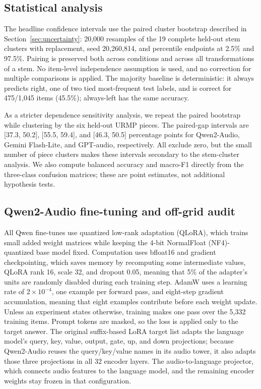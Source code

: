 \documentclass{article}
\begin{document}
\subsection{Statistical analysis}
\label{sec:appendix-stats}

The headline confidence intervals use the paired cluster bootstrap described in Section~\ref{sec:uncertainty}: 20,000 resamples of the 19 complete held-out stem clusters with replacement, seed 20,260,814, and percentile endpoints at 2.5\% and 97.5\%. Pairing is preserved both across conditions and across all transformations of a stem. No item-level independence assumption is used, and no correction for multiple comparisons is applied. The majority baseline is deterministic: it always predicts right, one of two tied most-frequent test labels, and is correct for 475/1,045 items (45.5\%); always-left has the same accuracy.

As a stricter dependence sensitivity analysis, we repeat the paired bootstrap while clustering by the six held-out URMP pieces. The paired-gap intervals are {[}37.3, 50.2{]}, {[}55.5, 59.4{]}, and {[}46.3, 50.5{]} percentage points for Qwen2-Audio, Gemini Flash-Lite, and GPT-audio, respectively. All exclude zero, but the small number of piece clusters makes these intervals secondary to the stem-cluster analysis. We also compute balanced accuracy and macro-F1 directly from the three-class confusion matrices; these are point estimates, not additional hypothesis tests.

\subsection{Qwen2-Audio fine-tuning and off-grid audit}
\label{sec:appendix-finetuning}

All Qwen fine-tunes use quantized low-rank adaptation (QLoRA), which trains small added weight matrices while keeping the 4-bit NormalFloat (NF4)-quantized base model fixed. Computation uses bfloat16 and gradient checkpointing, which saves memory by recomputing some intermediate values, QLoRA rank 16, scale 32, and dropout 0.05, meaning that 5\% of the adapter's units are randomly disabled during each training step. AdamW uses a learning rate of \(2 \times 10^{-4}\), one example per forward pass, and eight-step gradient accumulation, meaning that eight examples contribute before each weight update. Unless an experiment states otherwise, training makes one pass over the 5,332 training items. Prompt tokens are masked, so the loss is applied only to the target answer. The original suffix-based LoRA target list adapts the language model's query, key, value, output, gate, up, and down projections; because Qwen2-Audio reuses the query/key/value names in its audio tower, it also adapts those three projections in all 32 encoder layers. The audio-to-language projector, which connects audio features to the language model, and the remaining encoder weights stay frozen in that configuration.
\end{document}

